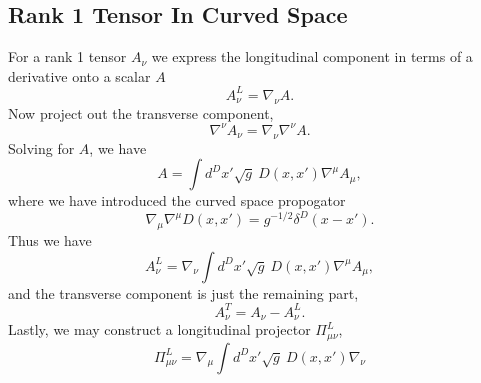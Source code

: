 \documentclass[10pt,letterpaper]{article}
\begin{document}
\subsection*{Rank 1 Tensor In Curved Space}
For a rank 1 tensor $A_\nu$ we express the longitudinal component in terms of a derivative onto a scalar $A$
\begin{equation}
A_\nu^L = \nabla_\nu A.
\end{equation}
Now project out the transverse component, 
\begin{equation}
\nabla^\nu A_\nu = \nabla_\nu \nabla^\nu A.
\end{equation}
Solving for $A$, we have
\begin{equation}
A = \int d^Dx'\sqrt{g}\  D(x,x') \nabla^\mu A_\mu,
\end{equation}
where we have introduced the curved space propogator
\begin{equation}
\nabla_\mu \nabla^\mu D(x,x') = g^{-1/2} \delta^D(x-x').
\end{equation}
Thus we have
\begin{equation}
A_\nu^L = \nabla_\nu \int d^Dx'\sqrt{g}\ D(x,x') \nabla^\mu A_\mu,
\end{equation}
and the transverse component is just the remaining part,
\begin{equation}
A_\nu^T = A_\nu - A_\nu^L.
\end{equation}
Lastly, we may construct a longitudinal projector $\Pi_{\mu\nu}^L$,
\begin{equation}
\Pi_{\mu\nu}^L = \nabla_\mu \int d^Dx'\sqrt{g}\  D(x,x') \nabla_\nu
\end{equation}
\end{document}
